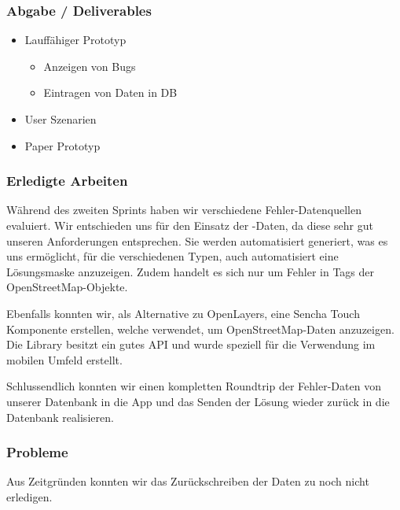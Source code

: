 \subsubsection{Abgabe / Deliverables}

\begin{itemize}
	\item Lauffähiger Prototyp
	\begin{itemize}
		\item Anzeigen von Bugs
		\item Eintragen von Daten in DB
	\end{itemize}
	\item User Szenarien
	\item Paper Prototyp
\end{itemize}

\subsubsection{Erledigte Arbeiten}
Während des zweiten Sprints haben wir verschiedene Fehler-Datenquellen evaluiert. Wir entschieden uns für den Einsatz der -Daten, da diese sehr gut unseren Anforderungen entsprechen. Sie werden automatisiert generiert, was es uns ermöglicht, für die verschiedenen Typen, auch automatisiert eine Lösungsmaske anzuzeigen. Zudem handelt es sich nur um Fehler in Tags der OpenStreetMap-Objekte.

Ebenfalls konnten wir, als Alternative zu OpenLayers, eine Sencha Touch Komponente erstellen, welche  verwendet, um OpenStreetMap-Daten anzuzeigen.
Die Library besitzt ein gutes \gls{API} und wurde speziell für die Verwendung im mobilen Umfeld erstellt.

Schlussendlich konnten wir einen kompletten Roundtrip der Fehler-Daten von unserer Datenbank in die App und das Senden der Lösung wieder zurück in die Datenbank realisieren.

\subsubsection{Probleme}
Aus Zeitgründen konnten wir das Zurückschreiben der Daten zu  noch nicht erledigen.